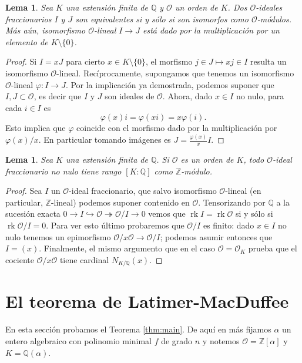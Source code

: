 \documentclass[11pt,a4paper]{amsart}
\newcommand{\Q}{\mathbb{Q}}
\newcommand{\Z}{\mathbb{Z}}
\DeclareMathOperator{\rk}{rk}
\numberwithin{equation}{section}
\theoremstyle{plain}
\newtheorem{lem}[equation]{Lema}
\renewcommand{\O}{\mathcal{O}}
\begin{document}
\begin{lem} \label{lem:hom=units}
Sea $K$ una extensión finita de $\Q$ y
$\mathcal O$ un orden de $K$.
Dos $\O$-ideales fraccionarios $I$
y $J$ son equivalentes si y sólo si son isomorfos como $\O$-módulos.
Más aún, isomorfismo $\O$-lineal $I \to J$ está dado por la multiplicación
por un elemento de $K\setminus \{0\}$.
\end{lem}
\begin{proof} Si $I = xJ$ para cierto $x \in K \setminus \{0\}$,
el morfismo $j \in J \mapsto xj \in I$ resulta un isomorfismo $\O$-lineal.
Recíprocamente, supongamos que tenemos un isomorfismo $\O$-lineal
$\varphi \colon I \to J$. Por la implicación ya demostrada, podemos suponer
que $I, J \subset \O$, es decir que $I$ y $J$ son ideales de $\O$.
Ahora, dado $x \in I$ no nulo, para cada $i \in I$ es
\[
\varphi(x)i = \varphi(xi) = x\varphi(i).
\]
Esto implica que $\varphi$ coincide con el morfismo dado por la multiplicación
por $\varphi(x)/x$. En particular tomando imágenes es
$J = \frac{\varphi(x)}{x} I$.
\end{proof}

\begin{lem} \label{lem:frac-range}
Sea $K$ una extensión finita de $\Q$. Si $\O$ es
un orden de $K$, todo $\O$-ideal fraccionario no nulo
tiene rango $[K:\Q]$ como $\Z$-módulo.
\end{lem}
\begin{proof} Sea $I$ un $\O$-ideal fraccionario, que salvo
isomorfismo $\O$-lineal (en particular, $\Z$-lineal) podemos suponer
contenido en $\O$. Tensorizando por $\Q$ a la sucesión exacta
$0\to I \hookrightarrow \O \twoheadrightarrow \O/I \to 0$
vemos que $\rk I = \rk \O$ si y sólo si $\rk \O/I = 0$.
Para ver esto último probaremos que $\O/I$ es finito:
dado $x \in I$ no nulo tenemos un epimorfismo
$\O/x \O \to \O/I$; podemos asumir entonces que $I = (x)$.
Finalmente, el mismo argumento que en el caso $\O = \O_K$ prueba que
el cociente $\O/x \O$ tiene cardinal $N_{K/\Q}(x)$.
\end{proof}

\section{El teorema de Latimer-MacDuffee}

En esta sección probamos el Teorema \ref{thm:main}.
De aquí en más fijamos $\alpha$ un entero algebraico con polinomio minimal $f$
de grado $n$ y notemos $\mathcal O = \Z[\alpha]$ y $K = \Q(\alpha)$.
\end{document}
